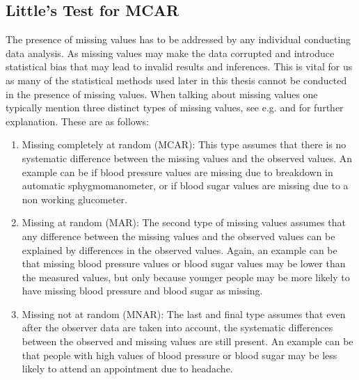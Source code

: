\documentclass[../thesis.tex]{subfiles}
\begin{document}
\subsection{Little's Test for MCAR}
\label{subsec:little}

\noindent The presence of missing values has to be addressed by any individual conducting data analysis. As missing values may make the data corrupted and introduce statistical bias that may lead to invalid results and inferences. This is vital for us as many of the statistical methods used later in this thesis cannot be conducted in the presence of missing values. When talking about missing values one typically mention three distinct types of missing values, see e.g. \cite{sterne2009multiple} and \cite{kaushal2014missing} for further explanation. These are as follows:

\begin{enumerate}[label=(\roman*)]
    \item Missing completely at random (MCAR): This type assumes that there is no systematic difference between the missing values and the observed values. An example can be if blood pressure values are missing due to breakdown in automatic sphygmomanometer, or if blood sugar values are missing due to a non working glucometer.
    \item Missing at random (MAR): The second type of missing values assumes that any difference between the missing values and the observed values can be explained by differences in the observed values. Again, an example can be that missing blood pressure values or blood sugar values may be lower than the measured values, but only because younger people may be more likely to have missing blood pressure and blood sugar as missing.
    \item Missing not at random (MNAR): The last and final type assumes that even after the observer data are taken into account, the systematic differences between the observed and missing values are still present. An example can be that people with high values of blood pressure or blood sugar may be less likely to attend an appointment due to headache.  
\end{enumerate}
\end{document}
